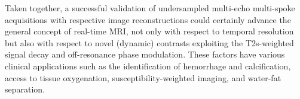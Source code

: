 Taken together, a successful validation of undersampled multi-echo multi-spoke acquisitions with respective image reconstructions could certainly advance the general concept of real-time MRI, not only with respect to temporal resolution but also with respect to novel (dynamic) contrasts exploiting the \acs{T2s}-weighted signal decay and off-resonance phase modulation. These factors have various clinical applications such as the identification of hemorrhage and calcification, access to tissue oxygenation, susceptibility-weighted imaging, and water-fat separation.
